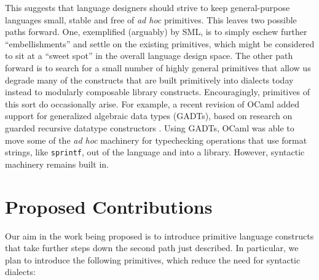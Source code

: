 This suggests that language designers should strive to keep general-purpose languages small, stable and free of \emph{ad hoc} primitives. This leaves  two possible paths forward. One, exemplified (arguably) by SML, is to simply eschew further ``embellishments'' and settle on the existing primitives, which might be considered to sit at a ``sweet spot'' in the overall language design space. %
The other path forward is to search for a small number of highly general primitives that allow us degrade many of the constructs that are built primitively into dialects today instead to modularly composable library constructs. 
Encouragingly, primitives of this sort do occasionally arise. For example, a recent revision of OCaml added support for  generalized algebraic data types (GADTs), based on research on guarded recursive datatype constructors \cite{XiCheChe03}. Using GADTs, OCaml was able to move some of the \emph{ad hoc} machinery for typechecking operations that use format strings, like \texttt{sprintf}, out of the language and into a library. However, syntactic machinery remains  built in. 



\section{Proposed Contributions}
Our aim in the work being proposed is to introduce primitive language constructs that take further steps down the second path just described. In particular, we plan to introduce the following primitives, which reduce the need for syntactic dialects:


